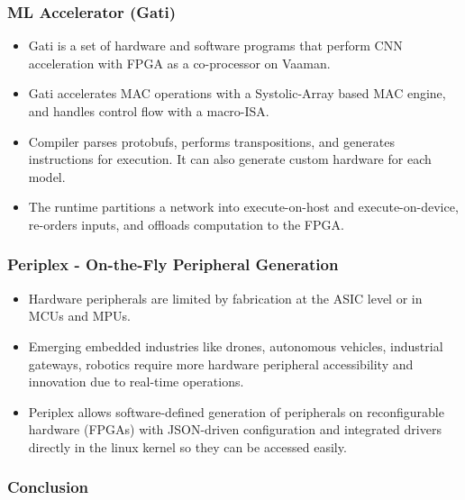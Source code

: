 \documentclass{beamer}
\begin{document}
{\begin{frame}[fragile]
\end{frame}

\begin{frame}[fragile]
  \frametitle{ML Accelerator (Gati)}
  \begin{itemize}
    \item Gati is a set of hardware and software programs that perform CNN
  acceleration with FPGA as a co-processor on Vaaman.
\item Gati accelerates MAC operations with a Systolic-Array based MAC engine,
  and handles control flow with a macro-ISA.
    \item Compiler parses protobufs, performs transpositions, and generates
      instructions for execution. It can also generate custom hardware for
      each model.
    \item The runtime partitions a network into execute-on-host and
      execute-on-device, re-orders inputs, and offloads computation
      to the FPGA.
  \end{itemize}
\end{frame}

\begin{frame}[fragile]
  \frametitle{Periplex - On-the-Fly Peripheral Generation}
  \begin{itemize}
    \item Hardware peripherals are limited by fabrication at the ASIC level or
      in MCUs and MPUs.
    \item Emerging embedded industries like drones, autonomous
  vehicles, industrial gateways, robotics require more hardware peripheral
  accessibility and innovation due to real-time operations.
    \item Periplex allows software-defined generation of peripherals on
      reconfigurable hardware (FPGAs) with JSON-driven configuration and
      integrated drivers directly in the linux kernel so they can be
      accessed easily.
  \end{itemize}
\end{frame}

\begin{frame}[fragile]
  \frametitle{Conclusion}
  \framesubtitle{}


\end{frame}}
\end{document}
